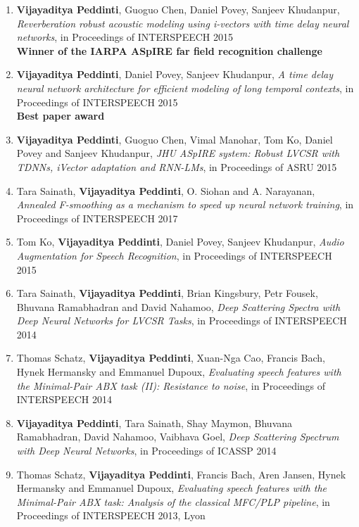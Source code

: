 \documentclass[margin,line,pifont,palatino,courier]{res}
\begin{document}
\begin{resume}
\begin{enumerate}
\item \textbf{Vijayaditya Peddinti}, Guoguo Chen, Daniel Povey, Sanjeev Khudanpur,
\textit{Reverberation robust acoustic modeling using i-vectors with time delay neural networks}, in Proceedings of INTERSPEECH 2015\\
\textbf{Winner of the IARPA ASpIRE far field recognition challenge}

\item \textbf{Vijayaditya Peddinti}, Daniel Povey, Sanjeev Khudanpur,
\textit{A time delay neural network architecture for efficient modeling of long temporal contexts}, in Proceedings of INTERSPEECH 2015\\
\textbf{Best paper award}

\item \textbf{Vijayaditya Peddinti}, Guoguo Chen, Vimal Manohar, Tom Ko, Daniel Povey and Sanjeev Khudanpur,
\textit{JHU ASpIRE system: Robust LVCSR with TDNNs, iVector adaptation and RNN-LMs}, in Proceedings of ASRU 2015\\

\item Tara Sainath, \textbf{Vijayaditya Peddinti}, O. Siohan and A. Narayanan,
\textit{Annealed F-smoothing as a mechanism to speed up neural network training}, in Proceedings of INTERSPEECH 2017

\item Tom Ko, \textbf{Vijayaditya Peddinti}, Daniel Povey, Sanjeev Khudanpur,
\textit{Audio Augmentation for Speech Recognition}, in Proceedings of INTERSPEECH 2015

\item Tara Sainath, \textbf{Vijayaditya Peddinti}, Brian Kingsbury, Petr Fousek, Bhuvana Ramabhadran and David Nahamoo,
\textit{Deep Scattering Spectra with Deep Neural Networks for LVCSR Tasks}, in Proceedings of INTERSPEECH 2014

\item Thomas Schatz, \textbf{Vijayaditya Peddinti}, Xuan-Nga Cao, Francis Bach, Hynek Hermansky and Emmanuel Dupoux,
\textit{Evaluating speech features with the Minimal-Pair ABX task (II): Resistance to noise}, in Proceedings of INTERSPEECH 2014

\item \textbf{Vijayaditya Peddinti}, Tara Sainath, Shay Maymon, Bhuvana Ramabhadran, David Nahamoo, Vaibhava Goel,
\textit{Deep Scattering Spectrum with Deep Neural Networks}, in Proceedings of ICASSP 2014

\item Thomas Schatz, \textbf{Vijayaditya Peddinti}, Francis Bach, Aren Jansen, Hynek Hermansky and Emmanuel Dupoux,
\textit{Evaluating speech features with the Minimal-Pair ABX task: Analysis of the classical MFC/PLP pipeline}, in Proceedings of INTERSPEECH 2013, Lyon


\end{enumerate}
\end{resume}
\end{document}
